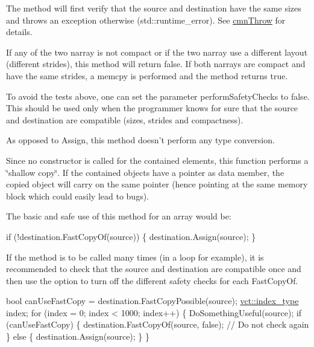 \begin{DoxyItemize}
\item The method will first verify that the source and destination have the same sizes and throws an exception otherwise ({\ttfamily std\-::runtime\-\_\-error}). See \hyperlink{cmn_throw_8h_a6fe29a0b6f112fe0032896bb904f8377}{cmn\-Throw} for details.
\item If any of the two narray is not compact or if the two narray use a different layout (different strides), this method will return {\ttfamily false}. If both narrays are compact and have the same strides, a {\ttfamily memcpy} is performed and the method returns {\ttfamily true}.
\item To avoid the tests above, one can set the parameter {\ttfamily perform\-Safety\-Checks} to {\ttfamily false}. This should be used only when the programmer knows for sure that the source and destination are compatible (sizes, strides and compactness).
\item As opposed to Assign, this method doesn't perform any type conversion.
\item Since no constructor is called for the contained elements, this function performs a \char`\"{}shallow copy\char`\"{}. If the contained objects have a pointer as data member, the copied object will carry on the same pointer (hence pointing at the same memory block which could easily lead to bugs).
\end{DoxyItemize}

The basic and safe use of this method for an array would be\-: 
\begin{DoxyCode}
\textcolor{keywordflow}{if} (!destination.FastCopyOf(source)) \{
    destination.Assign(source);
\}
\end{DoxyCode}


If the method is to be called many times (in a loop for example), it is recommended to check that the source and destination are compatible once and then use the option to turn off the different safety checks for each Fast\-Copy\-Of. 
\begin{DoxyCode}
\textcolor{keywordtype}{bool} canUseFastCopy = destination.FastCopyPossible(source);
\hyperlink{namespacevct_a50405d87494dce1f22ee3930ca285ee9}{vct::index\_type} index;
\textcolor{keywordflow}{for} (index = 0; index < 1000; index++) \{
    DoSomethingUseful(source);
    \textcolor{keywordflow}{if} (canUseFastCopy) \{
        destination.FastCopyOf(source, \textcolor{keyword}{false}); \textcolor{comment}{// Do not check again}
    \} \textcolor{keywordflow}{else} \{
        destination.Assign(source);
    \}
\}
\end{DoxyCode}



